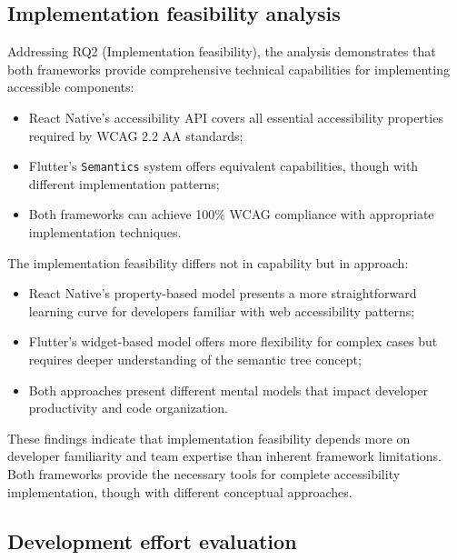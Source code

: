 \subsection{Implementation feasibility analysis}
\label{subsec:implementation-feasibility}

Addressing RQ2 (Implementation feasibility), the analysis demonstrates that both frameworks provide comprehensive technical capabilities for implementing accessible components:

\begin{itemize}
    \item React Native's accessibility API covers all essential accessibility properties required by WCAG 2.2 AA standards;
    
    \item Flutter's \texttt{Semantics} system offers equivalent capabilities, though with different implementation patterns;
    
    \item Both frameworks can achieve 100\% WCAG compliance with appropriate implementation techniques.
\end{itemize}

The implementation feasibility differs not in capability but in approach:

\begin{itemize}
    \item React Native's property-based model presents a more straightforward learning curve for developers familiar with web accessibility patterns;
    
    \item Flutter's widget-based model offers more flexibility for complex cases but requires deeper understanding of the semantic tree concept;
    
    \item Both approaches present different mental models that impact developer productivity and code organization.
\end{itemize}

These findings indicate that implementation feasibility depends more on developer familiarity and team expertise than inherent framework limitations. Both frameworks provide the necessary tools for complete accessibility implementation, though with different conceptual approaches.

\subsection{Development effort evaluation}
\label{subsec:development-effort}

